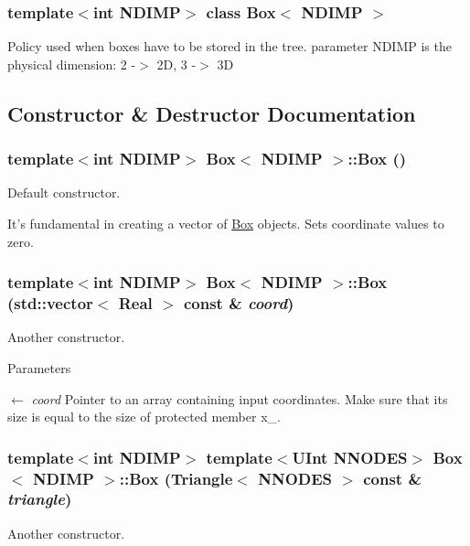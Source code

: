 \subsubsection*{template$<$int NDIMP$>$ class Box$<$ NDIMP $>$}

Policy used when boxes have to be stored in the tree. parameter NDIMP is the physical dimension: 2 -\/$>$ 2D, 3 -\/$>$ 3D 

\subsection{Constructor \& Destructor Documentation}
\hypertarget{classBox_a7548150a557424f99283efb7c4210c9c}{
\subsubsection[{Box}]{\setlength{\rightskip}{0pt plus 5cm}template$<$int NDIMP$>$ {\bf Box}$<$ NDIMP $>$::{\bf Box} ()}}
\label{classBox_a7548150a557424f99283efb7c4210c9c}
Default constructor.

It's fundamental in creating a vector of \hyperlink{classBox}{Box} objects. Sets coordinate values to zero. \hypertarget{classBox_abebee9f400cfe9c76f5a954a989fae68}{
\subsubsection[{Box}]{\setlength{\rightskip}{0pt plus 5cm}template$<$int NDIMP$>$ {\bf Box}$<$ NDIMP $>$::{\bf Box} (std::vector$<$ Real $>$ const \& {\em coord})}}
\label{classBox_abebee9f400cfe9c76f5a954a989fae68}
Another constructor.


\begin{DoxyParams}{Parameters}
\item[\mbox{$\leftarrow$} {\em coord}]Pointer to an array containing input coordinates. Make sure that its size is equal to the size of protected member x\_\-. \end{DoxyParams}
\hypertarget{classBox_a60c887b1a652f979d556369c1fff3405}{
\subsubsection[{Box}]{\setlength{\rightskip}{0pt plus 5cm}template$<$int NDIMP$>$ template$<$UInt NNODES$>$ {\bf Box}$<$ NDIMP $>$::{\bf Box} ({\bf Triangle}$<$ NNODES $>$ const \& {\em triangle})}}
\label{classBox_a60c887b1a652f979d556369c1fff3405}
Another constructor.


